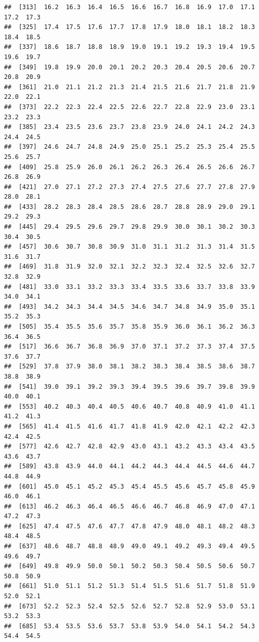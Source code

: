 \documentclass[
]{book}
\begin{document}
\begin{verbatim}
##  [313]  16.2  16.3  16.4  16.5  16.6  16.7  16.8  16.9  17.0  17.1  17.2  17.3
##  [325]  17.4  17.5  17.6  17.7  17.8  17.9  18.0  18.1  18.2  18.3  18.4  18.5
##  [337]  18.6  18.7  18.8  18.9  19.0  19.1  19.2  19.3  19.4  19.5  19.6  19.7
##  [349]  19.8  19.9  20.0  20.1  20.2  20.3  20.4  20.5  20.6  20.7  20.8  20.9
##  [361]  21.0  21.1  21.2  21.3  21.4  21.5  21.6  21.7  21.8  21.9  22.0  22.1
##  [373]  22.2  22.3  22.4  22.5  22.6  22.7  22.8  22.9  23.0  23.1  23.2  23.3
##  [385]  23.4  23.5  23.6  23.7  23.8  23.9  24.0  24.1  24.2  24.3  24.4  24.5
##  [397]  24.6  24.7  24.8  24.9  25.0  25.1  25.2  25.3  25.4  25.5  25.6  25.7
##  [409]  25.8  25.9  26.0  26.1  26.2  26.3  26.4  26.5  26.6  26.7  26.8  26.9
##  [421]  27.0  27.1  27.2  27.3  27.4  27.5  27.6  27.7  27.8  27.9  28.0  28.1
##  [433]  28.2  28.3  28.4  28.5  28.6  28.7  28.8  28.9  29.0  29.1  29.2  29.3
##  [445]  29.4  29.5  29.6  29.7  29.8  29.9  30.0  30.1  30.2  30.3  30.4  30.5
##  [457]  30.6  30.7  30.8  30.9  31.0  31.1  31.2  31.3  31.4  31.5  31.6  31.7
##  [469]  31.8  31.9  32.0  32.1  32.2  32.3  32.4  32.5  32.6  32.7  32.8  32.9
##  [481]  33.0  33.1  33.2  33.3  33.4  33.5  33.6  33.7  33.8  33.9  34.0  34.1
##  [493]  34.2  34.3  34.4  34.5  34.6  34.7  34.8  34.9  35.0  35.1  35.2  35.3
##  [505]  35.4  35.5  35.6  35.7  35.8  35.9  36.0  36.1  36.2  36.3  36.4  36.5
##  [517]  36.6  36.7  36.8  36.9  37.0  37.1  37.2  37.3  37.4  37.5  37.6  37.7
##  [529]  37.8  37.9  38.0  38.1  38.2  38.3  38.4  38.5  38.6  38.7  38.8  38.9
##  [541]  39.0  39.1  39.2  39.3  39.4  39.5  39.6  39.7  39.8  39.9  40.0  40.1
##  [553]  40.2  40.3  40.4  40.5  40.6  40.7  40.8  40.9  41.0  41.1  41.2  41.3
##  [565]  41.4  41.5  41.6  41.7  41.8  41.9  42.0  42.1  42.2  42.3  42.4  42.5
##  [577]  42.6  42.7  42.8  42.9  43.0  43.1  43.2  43.3  43.4  43.5  43.6  43.7
##  [589]  43.8  43.9  44.0  44.1  44.2  44.3  44.4  44.5  44.6  44.7  44.8  44.9
##  [601]  45.0  45.1  45.2  45.3  45.4  45.5  45.6  45.7  45.8  45.9  46.0  46.1
##  [613]  46.2  46.3  46.4  46.5  46.6  46.7  46.8  46.9  47.0  47.1  47.2  47.3
##  [625]  47.4  47.5  47.6  47.7  47.8  47.9  48.0  48.1  48.2  48.3  48.4  48.5
##  [637]  48.6  48.7  48.8  48.9  49.0  49.1  49.2  49.3  49.4  49.5  49.6  49.7
##  [649]  49.8  49.9  50.0  50.1  50.2  50.3  50.4  50.5  50.6  50.7  50.8  50.9
##  [661]  51.0  51.1  51.2  51.3  51.4  51.5  51.6  51.7  51.8  51.9  52.0  52.1
##  [673]  52.2  52.3  52.4  52.5  52.6  52.7  52.8  52.9  53.0  53.1  53.2  53.3
##  [685]  53.4  53.5  53.6  53.7  53.8  53.9  54.0  54.1  54.2  54.3  54.4  54.5

\end{verbatim}
\end{document}
